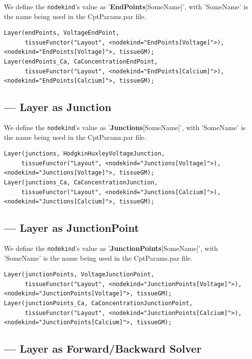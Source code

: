 We define the \verb!nodekind!'s value as '{\bf EndPoints}[SomeName]', with
'SomeName' is the name being used in the CptParams.par file.

{\tiny
\begin{verbatim}
Layer(endPoints, VoltageEndPoint, 
      tissueFunctor("Layout", <nodekind="EndPoints[Voltage]">), <nodekind="EndPoints[Voltage]">, tissueGM);
Layer(endPoints_Ca, CaConcentrationEndPoint, 
      tissueFunctor("Layout", <nodekind="EndPoints[Calcium]">), <nodekind="EndPoints[Calcium]">, tissueGM);
\end{verbatim}
}

\subsection{--- Layer as Junction}
\label{sec:Layer-as-Junction}

We define the \verb!nodekind!'s value as '{\bf Junctions}[SomeName]', with
'SomeName' is the name being used in the CptParams.par file.

{\tiny
\begin{verbatim}
Layer(junctions, HodgkinHuxleyVoltageJunction, 
     tissueFunctor("Layout", <nodekind="Junctions[Voltage]">), <nodekind="Junctions[Voltage]">, tissueGM);
Layer(junctions_Ca, CaConcentrationJunction, 
     tissueFunctor("Layout", <nodekind="Junctions[Calcium]">), <nodekind="Junctions[Calcium]">, tissueGM);
\end{verbatim}
}


\subsection{--- Layer as JunctionPoint}
\label{sec:Layer-as-JunctionPoint}

We define the \verb!nodekind!'s value as '{\bf JunctionPoints}[SomeName]', with
'SomeName' is the name being used in the CptParams.par file.

{\tiny
\begin{verbatim}
Layer(junctionPoints, VoltageJunctionPoint, 
      tissueFunctor("Layout", <nodekind="JunctionPoints[Voltage]">), <nodekind="JunctionPoints[Voltage]">, tissueGM);
Layer(junctionPoints_Ca, CaConcentrationJunctionPoint, 
      tissueFunctor("Layout", <nodekind="JunctionPoints[Calcium]">), <nodekind="JunctionPoints[Calcium]">, tissueGM);
\end{verbatim}
}

\subsection{--- Layer as Forward/Backward Solver}
\label{sec:Layer-as-Solver}

